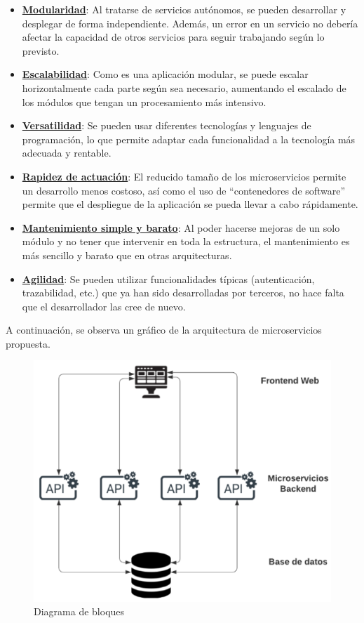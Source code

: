 \begin{itemize}
	\item \textbf{\underline{Modularidad}}: Al tratarse de servicios autónomos, se pueden desarrollar y desplegar de forma independiente. Además, un error en un servicio no debería afectar la capacidad de otros servicios para seguir trabajando según lo previsto.
	\item \textbf{\underline{Escalabilidad}}: Como es una aplicación modular, se puede escalar horizontalmente cada parte según sea necesario, aumentando el escalado de los módulos que tengan un procesamiento más intensivo.
	\item \textbf{\underline{Versatilidad}}: Se pueden usar diferentes tecnologías y lenguajes de programación, lo que permite adaptar cada funcionalidad a la tecnología más adecuada y rentable.
	\item \textbf{\underline{Rapidez de actuación}}: El reducido tamaño de los microservicios permite un desarrollo menos costoso, así como el uso de “contenedores de software” permite que el despliegue de la aplicación se pueda llevar a cabo rápidamente.
	\item \textbf{\underline{Mantenimiento simple y barato}}: Al poder hacerse mejoras de un solo módulo y no tener que intervenir en toda la estructura, el mantenimiento es más sencillo y barato que en otras arquitecturas.
	\item \textbf{\underline{Agilidad}}: Se pueden utilizar funcionalidades típicas (autenticación, trazabilidad, etc.) que ya han sido desarrolladas por terceros, no hace falta que el desarrollador las cree de nuevo.\\
\end{itemize}

A continuación, se observa un gráfico de la arquitectura de microservicios propuesta. 

\begin{figure}[H]
	\centering
	\includegraphics[width=\textwidth]{imagenes/resumen_tecnico.png} 
	\caption{Diagrama de bloques}
\end{figure} 

